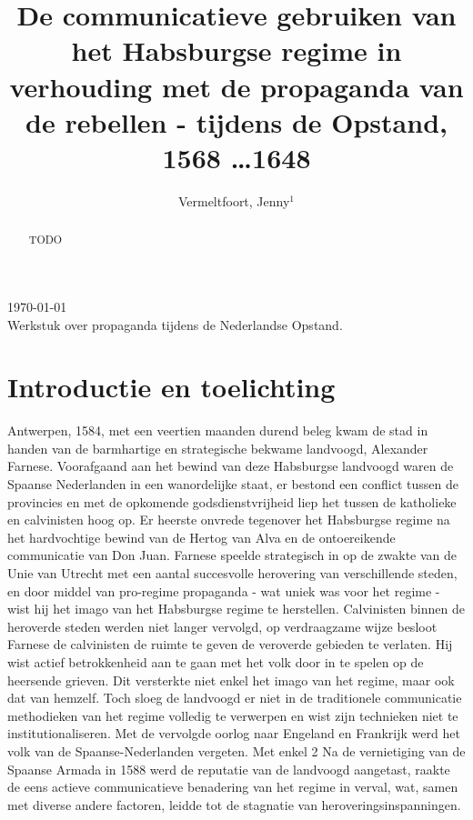 \documentclass[11pt]{amsart}
\begin{document}
\setcounter{page}{1}

\hfill     {\small \today} \\
{\small Werkstuk over propaganda tijdens de Nederlandse Opstand.}\hfill
{\small } %

\centerline{}

\centerline{}

\title[Propaganda tijdens de Opstand]{De communicatieve gebruiken van het Habsburgse regime in
     verhouding met de propaganda van de rebellen - tijdens de Opstand,
     1568 \ldots 1648}

\author[J. Vermeltfoort]{Vermeltfoort, Jenny$^1$}

\address{$^{1}$ 3787494, Faculteit Geesteswetenschappen, Leiden
     Universiteit, Leiden, Nederland.}
\email{\textcolor[rgb]{0.00,0.00,0.84}{j.vermeltfoort@umail.leidenuniv.nl}}

\begin{abstract}
     TODO
\end{abstract}
\maketitle

\section{Introductie en toelichting}

\noindent Antwerpen, 1584, met een veertien maanden durend beleg kwam de stad in handen van de barmhartige en
strategische bekwame landvoogd, Alexander Farnese. Voorafgaand aan het bewind van deze Habsburgse landvoogd waren de
Spaanse Nederlanden in een wanordelijke staat, er bestond een conflict tussen de provincies en met de opkomende
godsdienstvrijheid liep het tussen de katholieke en calvinisten hoog op. Er heerste
onvrede tegenover het Habsburgse regime na het hardvochtige bewind van de Hertog van Alva en de ontoereikende communicatie van Don Juan.
Farnese speelde strategisch in op de zwakte van de Unie van Utrecht met een
aantal succesvolle herovering van verschillende steden, en door middel van pro-regime propaganda - wat uniek was voor
het regime - wist hij het imago van het Habsburgse regime te herstellen. Calvinisten binnen de heroverde steden werden
niet langer vervolgd, op verdraagzame wijze besloot Farnese de calvinisten de ruimte te geven de veroverde gebieden te verlaten.
Hij wist actief betrokkenheid aan te gaan met het volk door in te spelen op de heersende grieven. Dit versterkte niet
enkel het imago van het regime, maar ook dat van hemzelf. Toch sloeg de landvoogd er niet in de traditionele communicatie
methodieken van het regime volledig te verwerpen en wist zijn technieken niet te institutionaliseren.
Met de vervolgde oorlog naar Engeland en Frankrijk werd het volk van de Spaanse-Nederlanden vergeten. Met enkel 2
Na de vernietiging van de Spaanse Armada in 1588 werd de reputatie van de landvoogd aangetast, raakte de
eens actieve communicatieve benadering van het regime in verval, wat, samen met diverse andere factoren,
leidde tot de stagnatie van heroveringsinspanningen.
\end{document}
